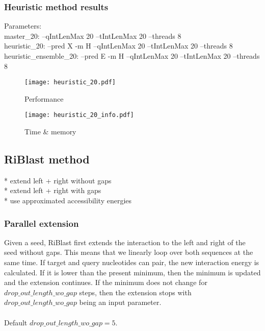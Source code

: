 \clearpage

\subsubsection{Heuristic method results}

Parameters:\\
master\_20: --qIntLenMax 20 --tIntLenMax 20 --threads 8\\
heuristic\_20: --pred X -m H --qIntLenMax 20 --tIntLenMax 20 --threads 8\\
heuristic\_ensemble\_20: --pred E -m H --qIntLenMax 20 --tIntLenMax 20 --threads 8\\

\begin{figure}[H]
	\centering
	\caption{Performance}
	\texttt{[image: heuristic\_20.pdf]}
\end{figure}

\begin{figure}[H]
	\centering
	\caption{Time \& memory}
	\texttt{[image: heuristic\_20\_info.pdf]}
\end{figure}

\clearpage

\subsection{RiBlast method}

* extend left + right without gaps\\
* extend left + right with gaps\\
* use approximated accessibility energies\\

\subsubsection{Parallel extension}

Given a seed, RiBlast first extends the interaction to the left and right of the seed without gaps. This means that we linearly loop over both sequences at the same time. If target and query nucleotides can pair, the new interaction energy is calculated. If it is lower than the present minimum, then the minimum is updated and the extension continues. If the minimum does not change for $drop\_out\_length\_wo\_gap$ steps, then the extension stops with $drop\_out\_length\_wo\_gap$ being an input parameter.
\\\\
Default $drop\_out\_length\_wo\_gap = 5$.


